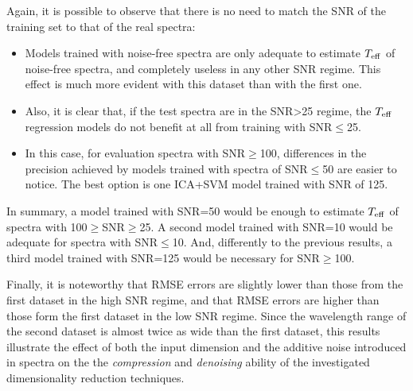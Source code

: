 \documentclass[a4paper,fleqn,usenatbib]{mnras}
\begin{document}
{{{Again, it is possible to observe that there is no need to match 
the SNR of the training set to that of the real spectra:
\begin{itemize}
\item Models trained with noise-free spectra are only adequate to 
	estimate $T_{\rm eff}$ of noise-free spectra, and completely 
	useless in any other SNR regime. This effect is much more evident 
	with this dataset than with the first one.
\item Also, it is clear that, if the test spectra are in the SNR>25 
	regime, the $T_{\rm eff}$ regression models do not benefit at all 
	from training with SNR$\le$25.
\item In this case, for evaluation spectra with SNR$\ge$100, differences 
	in the precision achieved by models trained with spectra of 
	SNR$\le$50 are easier to notice. The best 
	option is one ICA+SVM model trained with SNR of 125.
\end{itemize}

In summary, a model trained with SNR=50 would be enough to 
estimate $T_{\rm eff}$ of spectra with 100$\ge$SNR$\ge$25. A 
second model trained with SNR=10 would be adequate for spectra 
with SNR$\le$10. And, differently to the previous results, a third 
model trained with SNR=125 would be necessary for SNR$\ge$100. 

Finally, it is noteworthy that RMSE errors are slightly lower than those 
from the first dataset in the high SNR regime, and that RMSE errors are 
higher than those form the first dataset in the low SNR regime. 
Since the wavelength range of the second dataset is almost twice as wide 
than the first dataset, this results illustrate the effect of both the 
input dimension and the additive noise introduced in spectra 
on the the \textit{compression} and \textit{denoising} ability of the 
investigated dimensionality reduction techniques.


}}}
\end{document}

